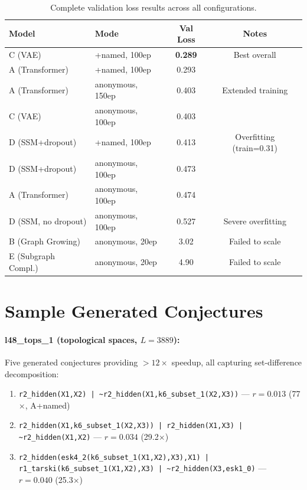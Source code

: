 \documentclass{article}
\begin{document}
\begin{table}[h]
\centering
\caption{Complete validation loss results across all configurations.}
\begin{tabular}{llcc}
\toprule
\textbf{Model} & \textbf{Mode} & \textbf{Val Loss} & \textbf{Notes} \\
\midrule
C (VAE) & +named, 100ep & \textbf{0.289} & Best overall \\
A (Transformer) & +named, 100ep & 0.293 & \\
A (Transformer) & anonymous, 150ep & 0.403 & Extended training \\
C (VAE) & anonymous, 100ep & 0.403 & \\
D (SSM+dropout) & +named, 100ep & 0.413 & Overfitting (train=0.31) \\
D (SSM+dropout) & anonymous, 100ep & 0.473 & \\
A (Transformer) & anonymous, 100ep & 0.474 & \\
D (SSM, no dropout) & anonymous, 100ep & 0.527 & Severe overfitting \\
B (Graph Growing) & anonymous, 20ep & 3.02 & Failed to scale \\
E (Subgraph Compl.) & anonymous, 20ep & 4.90 & Failed to scale \\
\bottomrule
\end{tabular}
\end{table}

\section{Sample Generated Conjectures}
\label{app:samples}

\paragraph{l48\_tops\_1 (topological spaces, $L{=}3889$):}
Five generated conjectures providing $>12\times$ speedup, all capturing
set-difference decomposition:
\begin{enumerate}
\item \texttt{r2\_hidden(X1,X2) | \~{}r2\_hidden(X1,k6\_subset\_1(X2,X3))}
      --- $r{=}0.013$ (77$\times$, A+named)
\item \texttt{r2\_hidden(X1,k6\_subset\_1(X2,X3)) | r2\_hidden(X1,X3) |
      \~{}r2\_hidden(X1,X2)} --- $r{=}0.034$ (29.2$\times$)
\item \texttt{r2\_hidden(esk4\_2(k6\_subset\_1(X1,X2),X3),X1) |
      r1\_tarski(k6\_subset\_1(X1,X2),X3) | \~{}r2\_hidden(X3,esk1\_0)}
      --- $r{=}0.040$ (25.3$\times$)
\end{enumerate}
\end{document}
